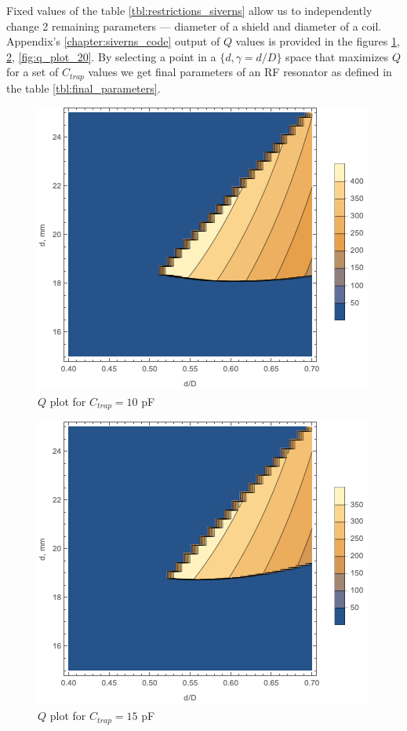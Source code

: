 Fixed values of the table \ref{tbl:restrictions_siverns} allow us to independently change 2 remaining parameters --- diameter of a shield and diameter of a coil. Appendix's \ref{chapter:siverns_code} output of $Q$ values is provided in the figures \ref{fig:q_plot_10}, \ref{fig:q_plot_15}, \ref{fig:q_plot_20}. By selecting a point in a $\{d, \gamma = d / D\}$ space that maximizes $Q$ for a set of $C_{trap}$ values we get final parameters of an RF resonator as defined in the table \ref{tbl:final_parameters}.
\clearpage
\begin{figure}[!h]
\centering
\includegraphics[width=.78\textwidth]{images/q_plot_siverns_tex_10}
\caption{$Q$ plot for $C_{trap} = 10$ pF}
\label{fig:q_plot_10}
\end{figure}
\begin{figure}[!h]
\centering
\includegraphics[width=.78\textwidth]{images/q_plot_siverns_tex_15}
\caption{$Q$ plot for $C_{trap} = 15$ pF}
\label{fig:q_plot_15}
\end{figure}
